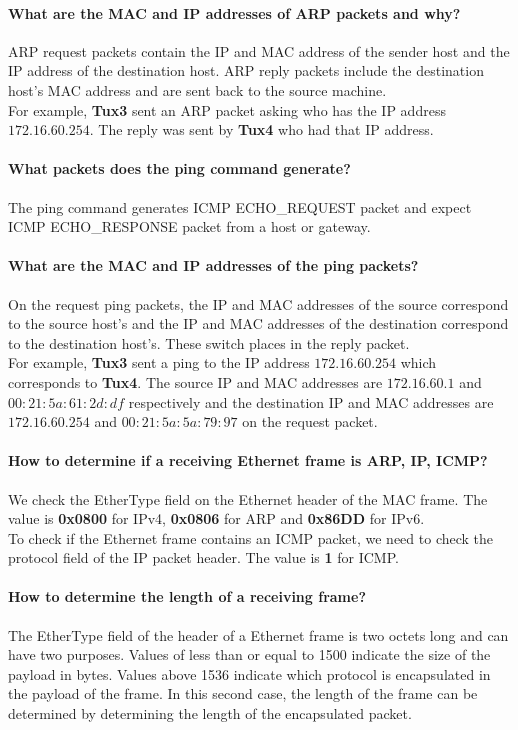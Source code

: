 \documentclass[11pt]{report}
\newcommand{\tux}[1]{\textbf{Tux#1}}
\begin{document}
\paragraph{What are the MAC and IP addresses of ARP packets and why?}
ARP request packets contain the IP and MAC address of the sender host and the IP
address of the destination host. ARP reply packets include the destination
host's MAC address and are sent back to the source machine.\\
For example, \tux{3} sent an ARP packet asking who has the IP address
$172.16.60.254$. The reply was sent by \tux{4} who had that IP address.

\paragraph{What packets does the ping command generate?}
The ping command generates ICMP ECHO\_REQUEST packet and expect
ICMP ECHO\_RESPONSE packet from a host or gateway.

\paragraph{What are the MAC and IP addresses of the ping packets?}
On the request ping packets, the IP and MAC addresses of the source correspond
to the source host's and the IP and MAC addresses of the destination correspond
to the destination host's. These switch places in the reply packet.\\
For example, \tux{3} sent a ping to the IP address $172.16.60.254$
which corresponds to \tux{4}. The source IP and MAC addresses are
$172.16.60.1$ and $00:21:5a:61:2d:df$ respectively and the destination
IP and MAC addresses are $172.16.60.254$ and $00:21:5a:5a:79:97$
on the request packet.

\paragraph{How to determine if a receiving Ethernet frame is ARP, IP, ICMP?}
We check the EtherType field on the Ethernet header of the MAC frame. The value is
\textbf{0x0800} for IPv4, \textbf{0x0806} for ARP and \textbf{0x86DD} for IPv6.\\
To check if the Ethernet frame contains an ICMP packet, we need to check the
protocol field of the IP packet header. The value is \textbf{1} for ICMP.

\paragraph{How to determine the length of a receiving frame?}
The EtherType field of the header of a Ethernet frame is two octets long and can
have two purposes. Values of less than or equal to 1500 indicate the size of the
payload in bytes. Values above 1536 indicate which protocol is encapsulated in
the payload of the frame. In this second case, the length of the frame can be
determined by determining the length of the encapsulated packet.
\end{document}
